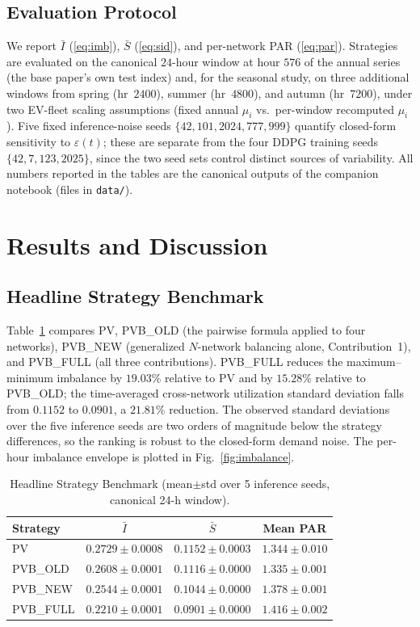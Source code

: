 \documentclass[10pt,journal]{IEEEtran}
\begin{document}
\subsection{Evaluation Protocol}
We report $\bar I$ (\ref{eq:imb}), $\bar S$ (\ref{eq:sid}), and per-network PAR
(\ref{eq:par}). Strategies are evaluated on the canonical $24$-hour window
at hour $576$ of the annual series (the base paper's own test index) and,
for the seasonal study, on three additional windows from spring
(hr~$2400$), summer (hr~$4800$), and autumn (hr~$7200$), under two EV-fleet
scaling assumptions (fixed annual $\mu_i$ vs.\ per-window recomputed
$\mu_i$). Five fixed inference-noise seeds
$\{42,101,2024,777,999\}$ quantify closed-form sensitivity to
$\varepsilon(t)$; these are separate from the four DDPG training seeds
$\{42,7,123,2025\}$, since the two seed sets control distinct sources of
variability. All numbers reported in the tables are the canonical outputs of
the companion notebook (files in \texttt{data/}).

\section{Results and Discussion}\label{sec:results}

\subsection{Headline Strategy Benchmark}
Table~\ref{tab:bench} compares PV, PVB\_OLD (the pairwise formula applied to
four networks), PVB\_NEW (generalized $N$-network balancing alone,
Contribution~1), and PVB\_FULL (all three contributions). PVB\_FULL reduces
the maximum--minimum imbalance by $19.03\%$ relative to PV and by $15.28\%$
relative to PVB\_OLD; the time-averaged cross-network utilization standard
deviation falls from $0.1152$ to $0.0901$, a $21.81\%$ reduction. The
observed standard deviations over the five inference seeds are two orders of
magnitude below the strategy differences, so the ranking is robust to the
closed-form demand noise. The per-hour imbalance envelope is plotted in
Fig.~\ref{fig:imbalance}.

\begin{table}[!t]
\footnotesize
\setlength{\tabcolsep}{4pt}
\caption{Headline Strategy Benchmark (mean${\pm}$std over 5 inference seeds,
canonical 24-h window).}
\label{tab:bench}
\centering
\begin{tabular}{lccc}\toprule
Strategy & $\bar I$ & $\bar S$ & Mean PAR \\ \midrule
PV        & $0.2729{\pm}0.0008$ & $0.1152{\pm}0.0003$ & $1.344{\pm}0.010$ \\
PVB\_OLD  & $0.2608{\pm}0.0001$ & $0.1116{\pm}0.0000$ & $1.335{\pm}0.001$ \\
PVB\_NEW  & $0.2544{\pm}0.0001$ & $0.1044{\pm}0.0000$ & $1.378{\pm}0.001$ \\
PVB\_FULL & $0.2210{\pm}0.0001$ & $0.0901{\pm}0.0000$ & $1.416{\pm}0.002$ \\ \bottomrule
\end{tabular}
\end{table}
\end{document}
